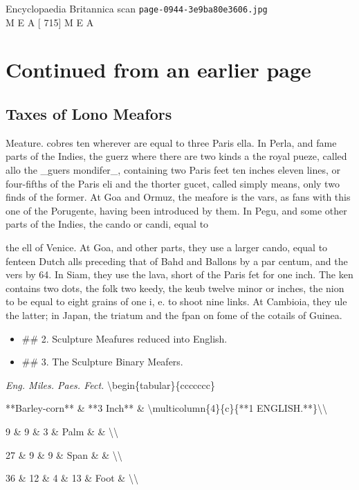 \documentclass{article}
\begin{document}
\begin{center}
{\Large Encyclopaedia Britannica scan \texttt{page-0944-3e9ba80e3606.jpg}}\\[0.5em]
M E A [ 715] M E A
\end{center}
\section*{Continued from an earlier page}
\subsection*{Taxes of Lono Meafors}
Meature. cobres ten wherever are equal to three Paris ella. In Perla, and fame parts of the Indies, the guerz where there are two kinds a the royal pueze, called allo the \_guers mondifer\_, containing two Paris feet ten inches eleven lines, or four-fifths of the Paris eli and the thorter gucet, called simply means, only two finds of the former. At Goa and Ormuz, the meafore is the vars, as fans with this one of the Porugente, having been introduced by them. In Pegu, and some other parts of the Indies, the cando or candi, equal to

the ell of Venice. At Goa, and other parts, they use a larger cando, equal to fenteen Dutch alls preceding that of Bahd and Ballons by a par centum, and the vers by 64. In Siam, they use the lava, short of the Paris fet for one inch. The ken contains two dots, the folk two keedy, the keub twelve minor or inches, the nion to be equal to eight grains of one i, e. to shoot nine links. At Cambioia, they ule the latter; in Japan, the triatum and the fpan on fome of the cotails of Guinea.

\begin{itemize}
\item \#\# 2. Sculpture Meafures reduced into English.
\item \#\# 3. The Sculpture Binary Meafers.
\end{itemize}
\textit{Eng. Miles. Paes. Fect.}
\textbackslash{}begin\{tabular\}\{ccccccc\}

**Barley-corn** \& **3 Inch** \& \textbackslash{}multicolumn\{4\}\{c\}\{**1 ENGLISH.**\}\textbackslash{}\textbackslash{}

9 \& 9 \& 3 \& Palm \& \& \textbackslash{}\textbackslash{}

27 \& 9 \& 9 \& Span \& \& \textbackslash{}\textbackslash{}

36 \& 12 \& 4 \& 13 \& Foot \& \textbackslash{}\textbackslash{}
\end{document}
